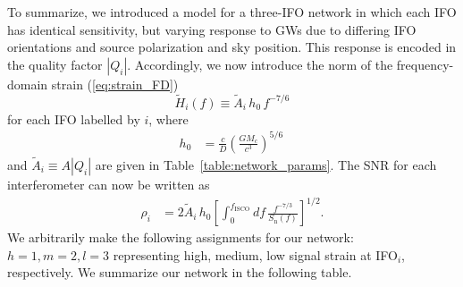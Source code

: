 \documentclass[prd,amsmath,amssymb,aps,floats,amsfonts,notitlepage,superscriptaddress,eqsecnum,nofootinbib,10pt]{revtex4-1}
\newcommand{\f}{\frac}
\newcommand{\be}{\begin{equation}}
\newcommand{\ee}{\end{equation}}
\begin{document}
To summarize, we introduced a model for a three-IFO network in which each IFO has identical sensitivity,
but varying response to GWs due to differing IFO orientations and source polarization and sky position. This response is encoded in the quality factor $|Q_i|$.
%
%
%
Accordingly, we now introduce the norm of the frequency-domain strain (\ref{eq:strain_FD}) 
%
\be
\tilde{H}_i(f)\equiv \tilde{A}_i\, h_0\, f^{-7/6} \label{eq:Hi_s}
\ee
%
for each IFO labelled by $i$, where
%
\begin{align}
h_0 &= \f{c}{D}\left(\f{G M_c}{c^3}\right)^{5/6} \label{eq:h0}\, 
\end{align}
%
and $\tilde{A}_i\equiv A |Q_i|$ %
are given in Table~\ref{table:network_params}. %
The SNR for each interferometer can now be written as
%
\begin{align}
\rho_i &= 2\tilde{A}_i\, h_0 \left[\int_0^{f_\text{ISCO}} df\, \f{f^{-7/3}}{S_\text{n}(f)} \right]^{1/2}\label{eq:SNR_i}.
\end{align}
%
We arbitrarily make the following assignments for our network: $h=1, m=2, l=3$ representing high, medium, low signal strain
at IFO$_i$, respectively. 
We summarize our network in the following table.
\end{document}
